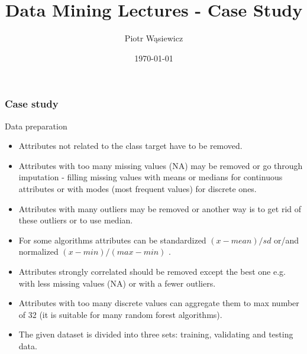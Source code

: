 \documentclass{beamer}
\title[EARIN]{Data Mining Lectures - Case Study}
\author{Piotr Wąsiewicz}
\institute[ICS PW]
{
Institute of Computer Science\\
\medskip
{\emph{pwasiewi@elka.pw.edu.pl}}
}
\date{\today}
\begin{document}

\lstset{frameround=trbl}
\lstset{commentstyle=\textit, stringstyle=\upshape,showspaces=false}

\begin{frame}
\titlepage
\end{frame}

\begin{frame}
\small
\frametitle{Case study}
\begin{block}{Data preparation}
\begin{itemize}
\item Attributes not related to the class target have to be removed.
\item Attributes with too many missing values (NA) may be removed or go through imputation - filling missing values with means or medians for continuous attributes or with modes (most frequent values) for discrete ones.
\item Attributes with many outliers may be removed or another way is to get rid of these outliers or to use median.
\item For some algorithms attributes can be standardized $(x-mean)/sd$ or/and normalized $(x - min)/(max -min)$ .
\item Attributes strongly correlated should be removed except the best one e.g. with less missing values (NA) or with a fewer outliers.
\item Attributes with too many discrete values can aggregate them to max number of 32 (it is suitable for many random forest algorithms).
\item The given dataset is divided into three sets: training, validating and testing data. 
\end{itemize}
\end{block}
\end{frame}
\end{document}
